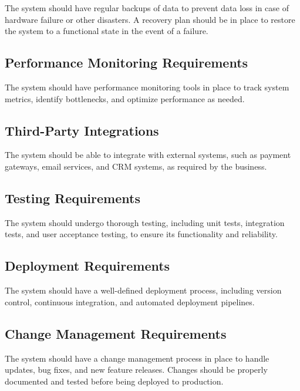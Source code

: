 The system should have regular backups of data to prevent data loss in case of hardware failure or other disasters. A recovery plan should be in place to restore the system to a functional state in the event of a failure.

\subsection{Performance Monitoring Requirements}

The system should have performance monitoring tools in place to track system metrics, identify bottlenecks, and optimize performance as needed.

\subsection{Third-Party Integrations}

The system should be able to integrate with external systems, such as payment gateways, email services, and CRM systems, as required by the business.

\subsection{Testing Requirements}

The system should undergo thorough testing, including unit tests, integration tests, and user acceptance testing, to ensure its functionality and reliability.

\subsection{Deployment Requirements}

The system should have a well-defined deployment process, including version control, continuous integration, and automated deployment pipelines.

\subsection{Change Management Requirements}

The system should have a change management process in place to handle updates, bug fixes, and new feature releases. Changes should be properly documented and tested before being deployed to production.